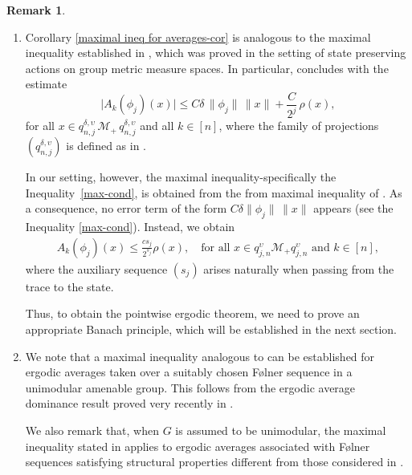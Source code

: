 \documentclass[11pt]{amsart}
\theoremstyle{definition}
\theoremstyle{myremark}
\newtheorem{rem}[thm]{Remark}
\numberwithin{equation}{section}
\newcommand{\CM}{\mathcal{M}}
\newcommand{\ups}{\upsilon}
\begin{document}
\begin{rem}\label{rem: max ineq rel}
\begin{enumerate}
    \item Corollary \ref{maximal ineq for averages-cor} is analogous to the maximal inequality established in \cite[Corollary~3.18]{Bik-Dip-Amenable}, which was proved in the setting of state preserving actions on group metric measure spaces. In particular, \cite[Corollary~3.18]{Bik-Dip-Amenable} concludes with the estimate
\[
\lvert A_k(\phi_j)(x) \rvert 
   \leq C\delta \, \| \phi_j \| \, \| x \|
   + \frac{C}{2^j}\, \rho(x),
\]
for all \(x \in q^{\delta,\ups}_{n,j}\, \mathcal{M}_+\, q^{\delta,\ups}_{n,j}\) and all \(k \in [n]\), where the family of projections \((q^{\delta,\ups}_{n,j})\) is defined as in \cite[Corollary~3.18]{Bik-Dip-Amenable}.

In our setting, however, the maximal inequality-specifically the Inequality~\ref{max-cond}, is obtained from the from maximal inequality of  \cite{cadilhac2022noncommutative}. As a consequence, no error term of the form \(C\delta \|\phi_j\|\,\|x\|\) appears (see the Inequality \ref{max-cond}). Instead, we obtain 
\begin{align*}
		    A_k(\phi_j)(x) \leq  \frac{c s_j}{2^{s_j}} \rho(x), \quad \text{for all } x \in q^{ \ups}_{j, n} \CM_+ q^{\ups}_{j, n} \text{ and } k \in [n],
		\end{align*}
where the auxiliary sequence \((s_j)\) arises naturally when passing from the trace to the state.

Thus, to obtain the pointwise ergodic theorem, we need to prove an appropriate Banach principle, which will be established in the next section.



\item 


We note that a maximal inequality analogous to \cite[Theorem~4.13]{Bik-Dip-neveu} can be established for ergodic averages taken over a suitably chosen F\o lner sequence in a unimodular amenable group. This follows from the ergodic average dominance result proved  very recently in \cite[Theorem~3.1]{chakraborty2025ergodic}.

We also remark that, when $G$ is assumed to be unimodular, the maximal inequality stated in  applies to ergodic averages associated with F\o lner sequences satisfying structural properties different from those considered in \cite[Theorem~3.1]{chakraborty2025ergodic}.

\end{enumerate}
\end{rem}
\end{document}
